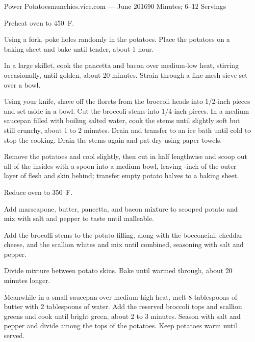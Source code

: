 \documentclass{article}
\begin{document}
\begin{recipe}{Power Potatoes}{munchies.vice.com --- June 2016}{90 Minutes; 6--12 Servings}

   \newstep
   Preheat oven to 450\ \0F.

   Using a fork, poke holes randomly in the potatoes. Place the potatoes on a
   baking sheet and bake until tender, about 1 hour. 

   In a large skillet, cook the pancetta and bacon over medium-low heat,
   stirring occasionally, until golden, about 20 minutes. Strain through a
   fine-mesh sieve set over a bowl.

   Using your knife, shave off the florets from the broccoli heads into 1/2-inch
   pieces and set aside in a bowl. Cut the broccoli stems into 1/4-inch pieces.
   In a medium saucepan filled with boiling salted water, cook the stems until
   slightly soft but still crunchy, about 1 to 2 minutes. Drain and transfer to
   an ice bath until cold to stop the cooking. Drain the stems again and pat dry
   using paper towels. 
 
   \newstep 
   Remove the potatoes and cool slightly, then cut in half lengthwise and scoop
   out all of the insides with a spoon into a medium bowl, leaving -inch of
   the outer layer of flesh and skin behind; transfer empty potato halves to a
   baking sheet. 

   \newstep
   Reduce oven to 350\ \0F.

   Add marscapone, butter, pancetta, and bacon mixture to scooped potato and mix
   with salt and pepper to taste until malleable.

   Add the brocolli stems to the potato filling, along with the bocconcini,
   cheddar cheese, and the scallion whites and mix until combined, seasoning
   with salt and pepper. 

   \newstep
   Divide mixture between potato skins. Bake until warmed through, about 20
   minutes longer.

   Meanwhile in a small saucepan over medium-high heat, melt 8 tablespoons of
   butter with 2 tablespoons of water. Add the reserved broccoli tops and
   scallion greens and cook until bright green, about 2 to 3 minutes. Season
   with salt and pepper and divide among the tops of the potatoes. Keep potatoes
   warm until served.

\end{recipe}
\end{document}
